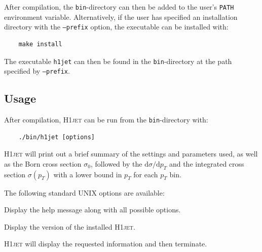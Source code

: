 \documentclass[12pt]{article}
\begin{document}
After compilation, the \texttt{bin}-directory can then be added to the
user's \texttt{PATH} environment variable. Alternatively, if the user
has specified an installation directory with the \texttt{--prefix}
option, the executable can be installed with:
\begin{lstlisting}
	make install  
\end{lstlisting}
The executable \texttt{h1jet} can then be found in the \texttt{bin}-directory at the path specified by \texttt{--prefix}. 

\subsection{Usage} 
After compilation, \textsc{H1jet} can be run from the \texttt{bin}-directory with: 
\begin{lstlisting}
	./bin/h1jet [options]  
\end{lstlisting}
\textsc{H1jet} will print out a brief summary of the settings
and parameters used, as well as the Born cross section
$\sigma_0$, followed by the $\mathrm{d}\sigma/\mathrm{d}p_{T}$
and the integrated cross section $\sigma(p_{T})$ with a lower
bound in $p_T$ for each $p_T$ bin.

      \noindent      
The following standard UNIX options are available: 
\begin{description}[labelindent=1cm, labelwidth =\widthof{\bfseries9999999999999999999999}, leftmargin = !] 
	\item[\texttt{-h, --help}] Display the help message along with all possible options. 
	\item[\texttt{-v, --version}] Display the version of the installed \textsc{H1jet}. 
\end{description}
\textsc{H1jet} will display the requested information and then terminate. 
\end{document}
